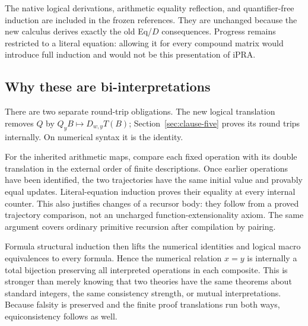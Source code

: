 The native logical derivations, arithmetic equality reflection, and quantifier-free induction are included in the frozen references. They are unchanged because the new calculus derives exactly the old Eq/$D$ consequences. Progress remains restricted to a literal equation: allowing it for every compound matrix would introduce full induction and would not be this presentation of iPRA.

\subsection{Why these are bi-interpretations}
There are two separate round-trip obligations. The new logical translation removes $Q$ by $Q_yB\mapsto D_{w,y}T(B)$; Section~\ref{sec:clause-five} proves its round trips internally. On numerical syntax it is the identity.

For the inherited arithmetic maps, compare each fixed operation with its double translation in the external order of finite descriptions. Once earlier operations have been identified, the two trajectories have the same initial value and provably equal updates. Literal-equation induction proves their equality at every internal counter. This also justifies changes of a recursor body: they follow from a proved trajectory comparison, not an uncharged function-extensionality axiom. The same argument covers ordinary primitive recursion after compilation by pairing.

Formula structural induction then lifts the numerical identities and logical macro equivalences to every formula. Hence the numerical relation $x=y$ is internally a total bijection preserving all interpreted operations in each composite. This is stronger than merely knowing that two theories have the same theorems about standard integers, the same consistency strength, or mutual interpretations. Because falsity is preserved and the finite proof translations run both ways, equiconsistency follows as well.
